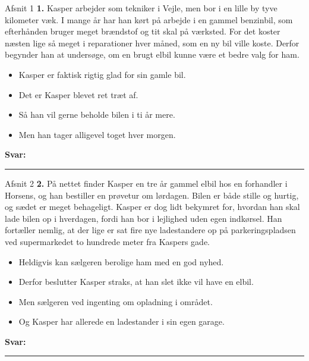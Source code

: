 \begin{emailbox}{Afsnit 1}
\textbf{1.} Kasper arbejder som tekniker i Vejle, men bor i en lille by tyve kilometer væk. I mange år har han kørt på arbejde i en gammel benzinbil, som efterhånden bruger meget brændstof og tit skal på værksted. \underline{\hspace{2.8cm}} For det koster næsten lige så meget i reparationer hver måned, som en ny bil ville koste. Derfor begynder han at undersøge, om en brugt elbil kunne være et bedre valg for ham.
\vspace{0.35em}
\begin{itemize}[leftmargin=1.6em, itemsep=0.15em]
  \item[\textbf{A.}] Kasper er faktisk rigtig glad for sin gamle bil.
  \item[\textbf{B.}] Det er Kasper blevet ret træt af.
  \item[\textbf{C.}] Så han vil gerne beholde bilen i ti år mere.
  \item[\textbf{D.}] Men han tager alligevel toget hver morgen.
\end{itemize}
\hfill \textbf{Svar:} \rule{1.2cm}{0.4pt}
\end{emailbox}

\begin{emailbox}{Afsnit 2}
\textbf{2.} På nettet finder Kasper en tre år gammel elbil hos en forhandler i Horsens, og han bestiller en prøvetur om lørdagen. Bilen er både stille og hurtig, og sædet er meget behageligt. Kasper er dog lidt bekymret for, hvordan han skal lade bilen op i hverdagen, fordi han bor i lejlighed uden egen indkørsel. \underline{\hspace{2.8cm}} Han fortæller nemlig, at der lige er sat fire nye ladestandere op på parkeringspladsen ved supermarkedet to hundrede meter fra Kaspers gade.
\vspace{0.35em}
\begin{itemize}[leftmargin=1.6em, itemsep=0.15em]
  \item[\textbf{A.}] Heldigvis kan sælgeren berolige ham med en god nyhed.
  \item[\textbf{B.}] Derfor beslutter Kasper straks, at han slet ikke vil have en elbil.
  \item[\textbf{C.}] Men sælgeren ved ingenting om opladning i området.
  \item[\textbf{D.}] Og Kasper har allerede en ladestander i sin egen garage.
\end{itemize}
\hfill \textbf{Svar:} \rule{1.2cm}{0.4pt}
\end{emailbox}

